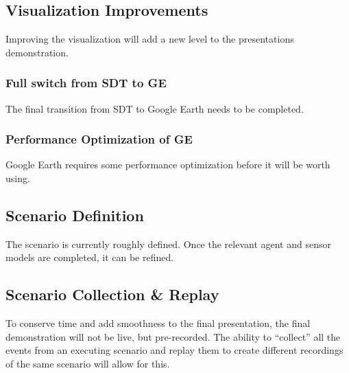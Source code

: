 \documentclass[titlepage]{article}
\begin{document}
\subsection{Visualization Improvements}
Improving the visualization will add a new level to the presentations demonstration.

\subsubsection{Full switch from SDT to GE}
The final transition from SDT to Google Earth needs to be completed.

\subsubsection{Performance Optimization of GE}
Google Earth requires some performance optimization before it will be worth using.

\subsection{Scenario Definition}
The scenario is currently roughly defined. Once the relevant agent and sensor models are completed, it can be refined.

\subsection{Scenario Collection \& Replay}
To conserve time and add smoothness to the final presentation, the final demonstration will not be live, but pre-recorded. The ability to ``collect'' all the events from an executing scenario and replay them to create different recordings of the same scenario will allow for this. 
\end{document}
